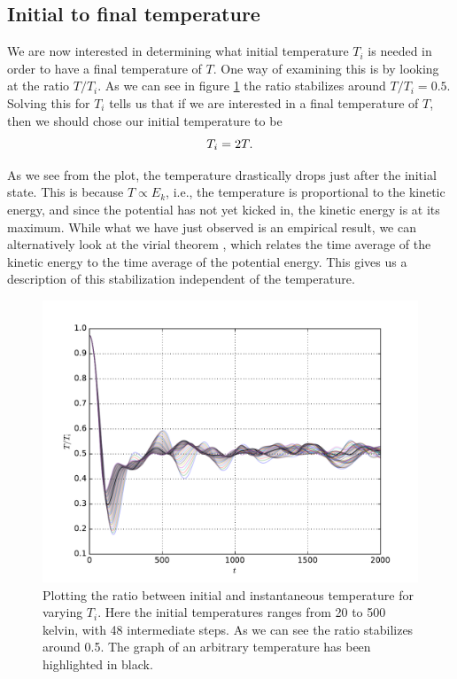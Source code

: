 \documentclass[a4paper]{article}
\begin{document}
\subsection{Initial to final temperature}
\label{sub:initial_to_final_temperature}

We are now interested in determining what initial temperature $T_i$ is needed
in order to have a final temperature of $T$.  One way of examining this is by
looking at the ratio $T/T_i$. As we can see in figure \ref{fig:temperature_ratio} the
ratio stabilizes around $T/T_i = 0.5$. Solving this for $T_i$ tells us that if
we are interested in a final temperature of $T$, then we should chose our
initial temperature to be
\begin{equation}
    \notag
    T_i = 2T.
\end{equation}

As we see from the plot, the temperature drastically drops just after the
initial state. This is because $T \propto E_k$, i.e., the temperature is
proportional to the kinetic energy, and since the potential has not yet kicked
in, the kinetic energy is at its maximum. While what we have just observed is
an empirical result, we can alternatively look at the virial theorem
\cite{virial}, which relates the time average of the kinetic energy to the time
average of the potential energy. This gives us a description of this
stabilization independent of the temperature. 

\begin{figure}[h]
    \centering \includegraphics[width=\linewidth]{temperature_ratio.pdf}
    \caption[Temperature ratio]{Plotting the ratio between initial and
        instantaneous temperature for varying $T_i$. Here the initial
        temperatures ranges from 20 to 500 kelvin, with 48 intermediate steps.
    As we can see the ratio stabilizes around 0.5. The graph of an arbitrary
temperature has been highlighted in black.}
    \label{fig:temperature_ratio}
\end{figure}
\end{document}
